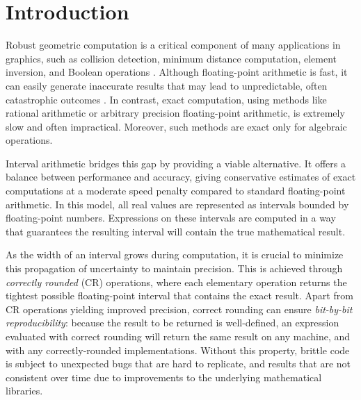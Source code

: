 
\section{Introduction}
\label{sec:introduction}
Robust geometric computation is a critical component of many applications in graphics, such as collision detection, minimum distance computation, element inversion, and Boolean operations \cite{something}. Although floating-point arithmetic is fast, it can easily generate inaccurate results that may lead to unpredictable, often catastrophic outcomes \cite{something}. In contrast, exact computation, using methods like rational arithmetic or arbitrary precision floating-point arithmetic, is extremely slow and often impractical.
Moreover, such methods are exact only for algebraic operations.

Interval arithmetic bridges this gap by providing a viable alternative.
It offers a balance between performance and accuracy, giving conservative estimates of exact computations at a moderate speed penalty compared to standard floating-point arithmetic. In this model, all real values are represented as intervals bounded by floating-point numbers. Expressions on these intervals are computed in a way that guarantees the resulting interval will contain the true mathematical result.

As the width of an interval grows during computation, it is crucial to minimize this propagation of uncertainty to maintain precision. This is achieved through \emph{correctly rounded} (CR) operations, where each elementary operation returns the tightest possible floating-point interval that contains the exact result.
Apart from CR operations yielding improved precision, correct rounding can ensure \emph{bit-by-bit reproducibility}: because the result to be returned is well-defined, an expression evaluated with correct rounding will return the same result on any machine, and with any correctly-rounded implementations.
Without this property, brittle code is subject to unexpected bugs that are hard to replicate, and results that are not consistent over time due to improvements to the underlying mathematical libraries.

%

